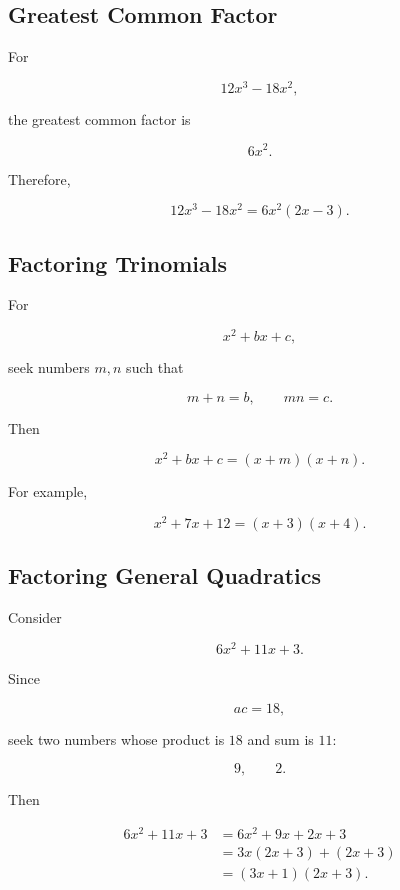 \subsection{Greatest Common Factor}
\label{subsec:gcf-factoring}

For

\[ 12x^3-18x^2, \]

the greatest common factor is

\[ 6x^2. \]

Therefore,

\[ 12x^3-18x^2=6x^2(2x-3). \]

\subsection{Factoring Trinomials}
\label{subsec:factoring-trinomials}

For

\[ x^2+bx+c, \]

seek numbers \(m,n\) such that

\[ m+n=b,\qquad mn=c. \]

Then

\[ x^2+bx+c=(x+m)(x+n). \]

For example,

\[ x^2+7x+12=(x+3)(x+4). \]

\subsection{Factoring General Quadratics}
\label{subsec:factoring-general-quadratics}

Consider

\[ 6x^2+11x+3. \]

Since

\[ ac=18, \]

seek two numbers whose product is \(18\) and sum is \(11\):

\[ 9,\qquad 2. \]

Then

\[
\begin{aligned}
6x^2+11x+3
&=6x^2+9x+2x+3\\
&=3x(2x+3)+(2x+3)\\
&=(3x+1)(2x+3).
\end{aligned}
\]

